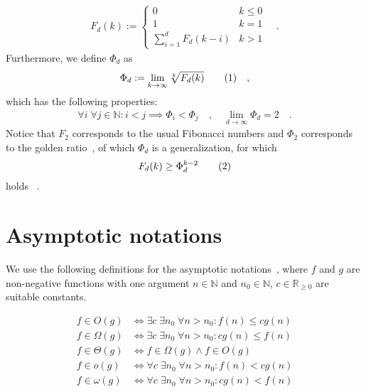 \documentclass[a4paper,12pt]{article}
\newcommand\numberthis{\addtocounter{equation}{1}\tag{\theequation}}
\newcommand\neqn[1]{\numberthis\label{eqn:#1}}
\begin{document}
\begin{align*}
F_d(k) := \begin{cases}
                0               & k \leq 0\\
                1               & k = 1\\
                \sum_{i=1}^{d}F_d(k-i) & k > 1
            \end{cases}
\quad .
\end{align*}
Furthermore, we define $\Phi_d$ as
\begin{align*}
\Phi_d := \lim_{k \rightarrow \infty} \sqrt[k]{F_d(k)} \neqn{goldenFib} \quad ,
\end{align*}
which has the following properties:
\begin{align*}
\forall i\; \forall j \in \mathbb{N}: i < j \implies \Phi_i < \Phi_j \quad , \quad \lim_{d\rightarrow \infty} \Phi_d = 2 \quad .
\end{align*}
Notice that $F_2$ corresponds to the usual Fibonacci numbers and $\Phi_2 $ corresponds to the golden ratio~\cite{Knuth73}, of which $\Phi_d$ is a generalization, for which
\begin{align*}
F_d(k) \geq \Phi_d^{k-2} \neqn{capocelli}
\end{align*}
holds ~\cite{capocelli1990generalized}.

\section{Asymptotic notations}
\label{sec:asymptotic}
We use the following definitions for the asymptotic notations~\cite{CLRS01}, where $f$ and $g$ are non-negative functions with one argument $n\in \mathbb{N}$ and $n_0 \in \mathbb{N}$, $c \in \mathbb{R}_{\geq 0}$ are suitable constants.

\begin{align*}
f \in O(g) &\iff \exists c\; \exists n_0 \;\forall n> n_0: f(n)\leq c g(n) \\
f \in \Omega(g) &\iff \exists c \; \exists n_0\;\forall n> n_0: cg(n) \leq f(n) \\
f \in \Theta(g) &\iff f \in \Omega(g) \land f\in O(g) \\
f \in o(g) &\iff \forall c \; \exists n_0\;\forall n> n_0: f(n) < cg(n) \\
f \in \omega(g) &\iff \forall c \; \exists n_0\;\forall n> n_0: cg(n) < f(n) \\
\end{align*}
\end{document}
